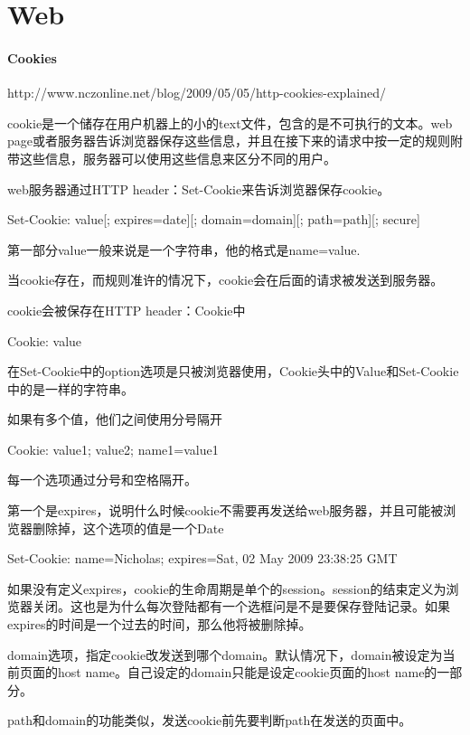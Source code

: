 \chapter{Web}

\subsubsection{Cookies}

http://www.nczonline.net/blog/2009/05/05/http-cookies-explained/

cookie是一个储存在用户机器上的小的text文件，包含的是不可执行的文本。web page或者服务器告诉浏览器保存这些信息，并且在接下来的请求中按一定的规则附带这些信息，服务器可以使用这些信息来区分不同的用户。

web服务器通过HTTP header：Set-Cookie来告诉浏览器保存cookie。
\begin{HTML5}
Set-Cookie: value[; expires=date][; domain=domain][; path=path][; secure]
\end{HTML5}

第一部分value一般来说是一个字符串，他的格式是name=value.

当cookie存在，而规则准许的情况下，cookie会在后面的请求被发送到服务器。

cookie会被保存在HTTP header：Cookie中
\begin{HTML5}
Cookie: value
\end{HTML5}
在Set-Cookie中的option选项是只被浏览器使用，Cookie头中的Value和Set-Cookie中的是一样的字符串。

如果有多个值，他们之间使用分号隔开
\begin{HTML5}
Cookie: value1; value2; name1=value1
\end{HTML5}

每一个选项通过分号和空格隔开。

第一个是expires，说明什么时候cookie不需要再发送给web服务器，并且可能被浏览器删除掉，这个选项的值是一个Date
\begin{HTML5}
Set-Cookie: name=Nicholas; expires=Sat, 02 May 2009 23:38:25 GMT
\end{HTML5}
如果没有定义expires，cookie的生命周期是单个的session。session的结束定义为浏览器关闭。这也是为什么每次登陆都有一个选框问是不是要保存登陆记录。如果expires的时间是一个过去的时间，那么他将被删除掉。

domain选项，指定cookie改发送到哪个domain。默认情况下，domain被设定为当前页面的host name。自己设定的domain只能是设定cookie页面的host name的一部分。

path和domain的功能类似，发送cookie前先要判断path在发送的页面中。

